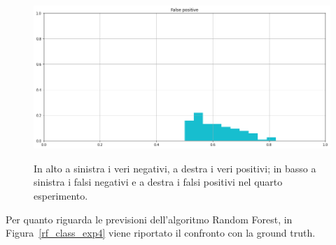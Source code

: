 \documentclass[12pt]{report}
\theoremstyle{definition}
\begin{document}
\begin{figure}
\begin{minipage}{0.48\textwidth}
   \end{minipage}
   \begin{minipage}{0.48\textwidth}
     \includegraphics[width=\linewidth]{images/experiment_uniform_sovrapposti/fp.png}\label{fp_us}
   \end{minipage}
   \caption{In alto a sinistra i veri negativi, a destra i veri positivi; in basso a sinistra i falsi negativi e a destra i falsi positivi nel quarto esperimento.}
   \label{4cases_exp4}
\end{figure}
Per quanto riguarda le previsioni dell'algoritmo Random Forest, in Figura~\ref{rf_class_exp4} viene riportato il confronto con la ground truth.
\end{document}
